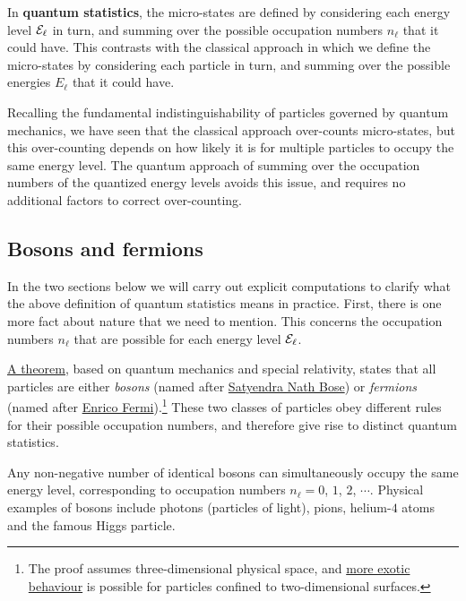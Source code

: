 \begin{shaded}
  In \textbf{quantum statistics}, the micro-states are defined by considering each energy level $\mathcal E_{\ell}$ in turn, and summing over the possible occupation numbers $n_{\ell}$ that it could have.
  This contrasts with the classical approach in which we define the micro-states by considering each particle in turn, and summing over the possible energies $E_{\ell}$ that it could have.
\end{shaded}

Recalling the fundamental indistinguishability of particles governed by quantum mechanics, we have seen that the classical approach over-counts micro-states, but this over-counting depends on how likely it is for multiple particles to occupy the same energy level.
The quantum approach of summing over the occupation numbers of the quantized energy levels avoids this issue, and requires no additional factors to correct over-counting.



\subsection{Bosons and fermions}
In the two sections below we will carry out explicit computations to clarify what the above definition of quantum statistics means in practice.
First, there is one more fact about nature that we need to mention.
This concerns the occupation numbers $n_{\ell}$ that are possible for each energy level $\mathcal E_{\ell}$.

\href{https://en.wikipedia.org/wiki/Spin-statistics_theorem}{A theorem}, based on quantum mechanics and special relativity, states that all particles are either \textit{bosons} (named after \href{https://en.wikipedia.org/wiki/Satyendra_Nath_Bose}{Satyendra Nath Bose}) or \textit{fermions} (named after \href{https://en.wikipedia.org/wiki/Enrico_Fermi}{Enrico Fermi}).\footnote{The proof assumes three-dimensional physical space, and \href{https://en.wikipedia.org/wiki/Anyon}{more exotic behaviour} is possible for particles confined to two-dimensional surfaces.}
These two classes of particles obey different rules for their possible occupation numbers, and therefore give rise to distinct quantum statistics.

Any non-negative number of identical bosons can simultaneously occupy the same energy level, corresponding to occupation numbers $n_{\ell} = 0$, $1$, $2$, $\cdots$.
Physical examples of bosons include photons (particles of light), pions, helium-$4$ atoms and the famous Higgs particle.

